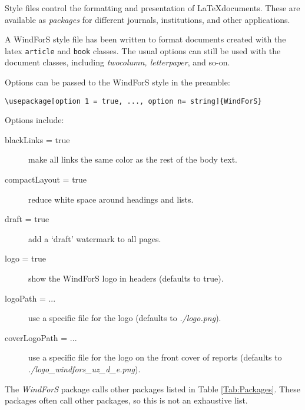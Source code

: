 Style files control the formatting and presentation of \LaTeX documents. These are available as \emph{packages} for different journals, institutions, and other applications. 

A WindForS style file has been written to format documents created with the latex \texttt{article} and \texttt{book} classes. The usual options can still be used with the document classes, including \emph{twocolumn, letterpaper}, and so-on.

Options can be passed to the WindForS style in the preamble:

\begin{lstlisting}
\usepackage[option 1 = true, ..., option n= string]{WindForS}
\end{lstlisting}

Options include:
\begin{description}
\item[blackLinks = true]{make all links the same color as the rest of the body text.}
\item[compactLayout = true]{reduce white space around headings and lists.}
\item[draft = true]{add a `draft' watermark to all pages.}
\item[logo = true]{show the WindForS logo in headers (defaults to true).}
\item[logoPath = ...]{use a specific file for the logo (defaults to \emph{./logo.png}).}
\item[coverLogoPath = ...]{use a specific file for the logo on the front cover of reports (defaults to \emph{./logo\_windfors\_uz\_d\_e.png}).}
\end{description}

The \emph{WindForS} package calls other packages listed in Table \ref{Tab:Packages}. These packages often call other packages, so this is not an exhaustive list.

